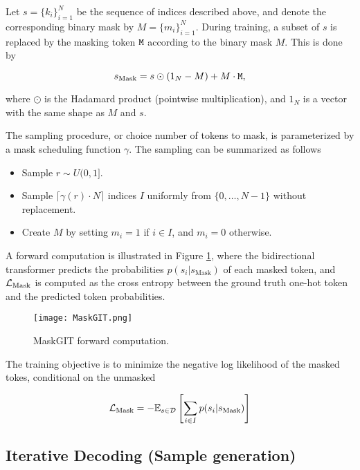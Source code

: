 \documentclass[../../thesis.tex]{subfiles}
\begin{document}
Let $s = \{k_i\}_{i=1}^N$ be the sequence of indices described above, and denote the corresponding binary mask by $M = \{m_i\}_{i=1}^N$. During training, a subset of $s$ is replaced by the masking token $\texttt{M}$ according to the binary mask $M$. This is done by 

\begin{equation}
    s_\text{Mask} = s\odot (1_N-M) +  M\cdot\texttt{M},
\end{equation}

where $\odot$ is the Hadamard product (pointwise multiplication), and $1_N$ is a vector with the same shape as $M$ and $s$.\newline

The sampling procedure, or choice number of tokens to mask, is parameterized by a mask scheduling function $\gamma$. The sampling can be summarized as follows

\begin{itemize}
    \item Sample $r \sim U(0,1]$.
    \item Sample $\lceil \gamma(r)\cdot N \rceil$ indices $I$ uniformly from $\{0,\dots,N-1\}$ without replacement. 
    \item Create $M$ by setting $m_i = 1$ if $i\in I$, and $m_i = 0$ otherwise.
\end{itemize}

A forward computation is illustrated in Figure \ref{fig:MaskGIT}, where the bidirectional transformer predicts the probabilities $p(s_i|s_\text{Mask})$ of each masked token, and $\mathcal{L}_\text{Mask}$ is computed as the cross entropy between the ground truth one-hot token and the predicted token probabilities. 

\begin{figure}[h]
    \texttt{[image: MaskGIT.png]}
    \centering 
    \caption{MaskGIT forward computation.}
    \label{fig:MaskGIT}
\end{figure}

The training objective is to minimize the negative log likelihood of the masked tokes, conditional on the unmasked

\begin{equation}
    \mathcal{L}_\text{Mask} = -\mathbb{E}_{s\in \mathcal{D}}\left[\sum_{i \in I} p(s_i|s_\text{Mask} ) \right]
\end{equation}

\subsection{Iterative Decoding (Sample generation)}
\end{document}
